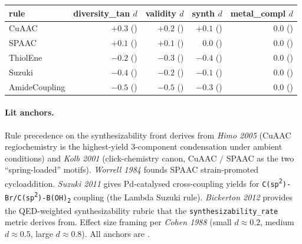 \begin{center}
\small
\setlength{\tabcolsep}{4pt}
\begin{tabular}{lrrrr}
\toprule
\textbf{rule} & \textbf{diversity\_tan $d$} & \textbf{validity $d$} & \textbf{synth $d$} & \textbf{metal\_compl $d$} \\
\midrule
CuAAC           & $+0.3$ (\PROJECTED{}) & $+0.2$ (\PROJECTED{}) & $+0.1$ (\PROJECTED{}) & $0.0$ (\PROJECTED{}) \\
SPAAC           & $+0.1$ (\PROJECTED{}) & $+0.1$ (\PROJECTED{}) & $0.0$ (\PROJECTED{})  & $0.0$ (\PROJECTED{}) \\
ThiolEne        & $-0.2$ (\PROJECTED{}) & $-0.3$ (\PROJECTED{}) & $-0.4$ (\PROJECTED{}) & $0.0$ (\PROJECTED{}) \\
Suzuki          & $-0.4$ (\PROJECTED{}) & $-0.2$ (\PROJECTED{}) & $-0.1$ (\PROJECTED{}) & $0.0$ (\PROJECTED{}) \\
AmideCoupling   & $-0.5$ (\PROJECTED{}) & $-0.5$ (\PROJECTED{}) & $-0.3$ (\PROJECTED{}) & $0.0$ (\PROJECTED{}) \\
\bottomrule
\end{tabular}
\end{center}

\paragraph{Lit anchors.}
Rule precedence on the synthesizability front derives from
\emph{Himo 2005} (CuAAC regiochemistry is the highest-yield
3-component condensation under ambient conditions) and
\emph{Kolb 2001} (click-chemistry canon, CuAAC / SPAAC as
the two ``spring-loaded'' motifs).  \emph{Worrell 1984}
founds SPAAC strain-promoted cycloaddition.  \emph{Suzuki 2011}
gives Pd-catalysed cross-coupling yields for
\texttt{C(sp\textsuperscript{2})-Br/C(sp\textsuperscript{2})-B(OH)\textsubscript{2}}
coupling (the Lambda Suzuki rule).  \emph{Bickerton 2012}
provides the QED-weighted synthesizability rubric that the
\texttt{synthesizability\_rate} metric derives from.  Effect
size framing per \emph{Cohen 1988} (small $d \approx 0.2$,
medium $d \approx 0.5$, large $d \approx 0.8$).  All anchors
are \CITEDONLY{}.

